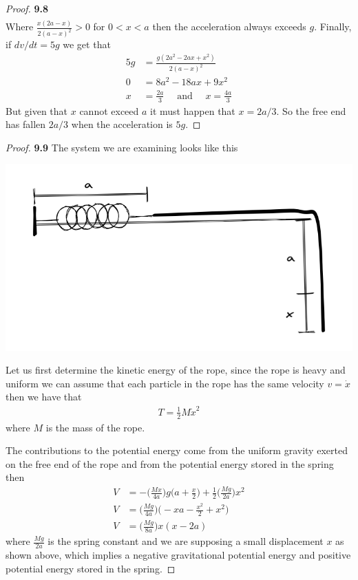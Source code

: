 \documentclass[11pt]{article}
\theoremstyle{definition}
\begin{document}
\begin{proof}{\textbf{9.8}}
\begin{align*}
        \end{align*}
        Where $\frac{x(2a-x)}{2(a-x)^2} > 0$ for $0 < x < a$ then the
        acceleration always exceeds $g$. Finally, if $dv/dt = 5g$ we get that
        \begin{align*}
            5g &= \frac{g(2a^2-2ax+x^2)}{2(a-x)^2}\\
            0 &= 8a^2 - 18ax + 9x^2\\
            x &= \frac{2a}{3} \quad\text{ and }\quad x = \frac{4a}{3}
        \end{align*}
        But given that $x$ cannot exceed $a$ it must happen that $x = 2a/3$.
        So the free end has fallen $2a/3$ when the acceleration is $5g$.
    \end{proof}
\cleardoublepage
    \begin{proof}{\textbf{9.9}}
        The system we are examining looks like this
        \begin{center}
            \includegraphics[scale=0.5]{ch9-9.png}
        \end{center}
        Let us first determine the kinetic energy of the rope, since the rope
        is heavy and uniform we can assume that each particle in the rope has
        the same velocity $v = \dot x$ then we have that
        \begin{align*}
            T = \frac{1}{2}M\dot{x}^2
        \end{align*}
        where $M$ is the mass of the rope.

        The contributions to the potential energy come from the uniform
        gravity exerted on the free end of the rope and from the potential
        energy stored in the spring then
        \begin{align*}
            V &= -\bigg(\frac{Mx}{4a}\bigg)g\bigg(a + \frac{x}{2}\bigg)
            + \frac{1}{2}\bigg(\frac{Mg}{2a}\bigg)x^2\\
            V &= \bigg(\frac{Mg}{4a}\bigg)\bigg(-xa - \frac{x^2}{2} + x^2\bigg)\\
            V &= \bigg(\frac{Mg}{8a}\bigg)x(x -2a)
        \end{align*}
        where $\frac{Mg}{2a}$ is the spring constant and we are supposing a
        small displacement $x$ as shown above, which implies a negative
        gravitational potential energy and positive potential energy stored
        in the spring.


\end{proof}
\end{document}
